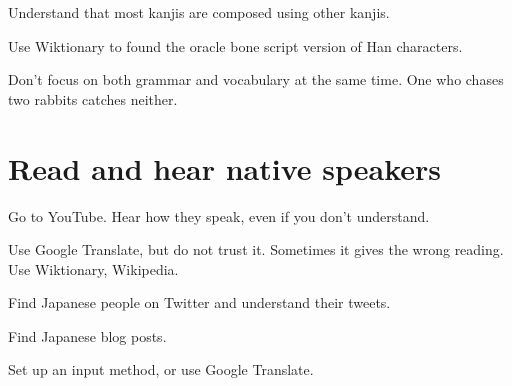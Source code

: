 \documentclass[12pt,openany]{book}
\begin{document}
Understand that most kanjis are composed using other kanjis.

Use Wiktionary to found the oracle bone script version of Han characters.

Don't focus on both grammar and vocabulary at the same time.
One who chases two rabbits catches neither.

\section{Read and hear native speakers}

Go to YouTube.
Hear how they speak, even if you don't understand.

Use Google Translate, but do not trust it.
Sometimes it gives the wrong reading.
Use Wiktionary, Wikipedia.

Find Japanese people on Twitter and understand their tweets.

Find Japanese blog posts.

Set up an input method, or use Google Translate.









\end{document}
